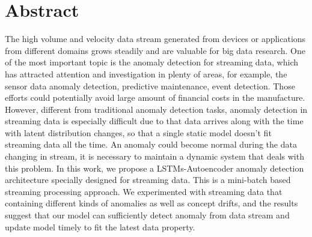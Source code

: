 \chapter*{Abstract}
\label{chap:abstract}
The high volume and velocity data stream generated from devices or applications from different domains grows steadily and are valuable for big data research. One of the most important topic is the anomaly detection for streaming data, which has attracted attention and investigation in plenty of areas, for example, the sensor data anomaly detection, predictive maintenance, event detection. Those efforts could potentially avoid large amount of financial costs in the manufacture. However, different from traditional anomaly detection tasks, anomaly detection in streaming data is especially difficult due to that data arrives along with the time with latent distribution changes, so that a single static model doesn’t fit streaming data all the time. An anomaly could become normal during the data changing in stream, it is necessary to maintain a dynamic system that deals with this problem. In this work, we propose a LSTMs-Autoencoder anomaly detection architecture specially designed for streaming data. This is a mini-batch based streaming processing approach. We experimented with streaming data that containing different kinds of anomalies as well as concept drifts, and the results suggest that our model can sufficiently detect anomaly from data stream and update model timely to fit the latest data property.
